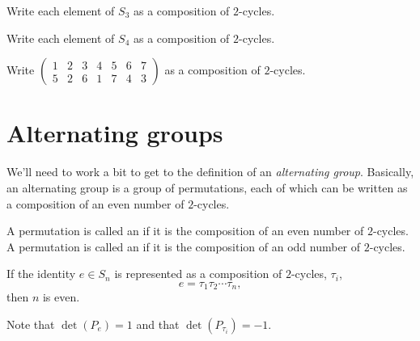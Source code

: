 \documentclass{ximera}
\begin{document}
\begin{exercise}
  Write each element of $S_3$ as a composition of $2$-cycles.
\end{exercise}

\begin{exercise}
  Write each element of $S_4$ as a composition of $2$-cycles.
\end{exercise}

\begin{exercise}
  Write $\left(\begin{smallmatrix}
    1 & 2 & 3 & 4 & 5 & 6 & 7 \\
    5 & 2 & 6 & 1 & 7 & 4 & 3
  \end{smallmatrix}\right)$ as a composition of $2$-cycles.
\end{exercise}



\section{Alternating groups}


We'll need to work a bit to get to the definition of an
\textit{alternating group}. Basically, an alternating group is a group
of permutations, each of which can be written as a composition of an
even number of $2$-cycles.




\begin{definition}
  A permutation is called an  if it is the
  composition of an even number of $2$-cycles. A permutation is called
  an  if it is the composition of an odd number
  of $2$-cycles.
\end{definition}










\begin{lemma}
  If the identity $e\in S_n$ is represented as a composition of $2$-cycles, $\tau_i$, 
  \[
  e = \tau_1 \tau_2 \cdots \tau_n,
  \]
  then $n$ is even.
  \begin{sketch}
    Note that $\det(P_{e})=1$ and that $\det(P_{\tau_i})=-1$.
  \end{sketch}
\end{lemma}
\end{document}
